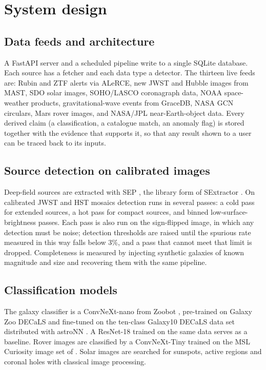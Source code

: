 \documentclass[preprint,11pt,authoryear]{elsarticle}
\begin{document}
\section{System design}
\label{sec:design}

\subsection{Data feeds and architecture}

A FastAPI server and a scheduled pipeline write to a single SQLite database. Each
source has a fetcher and each data type a detector. The thirteen live feeds are:
Rubin and ZTF alerts via ALeRCE, new JWST and Hubble images from MAST, SDO solar
images, SOHO/LASCO coronagraph data, NOAA space-weather products,
gravitational-wave events from GraceDB, NASA GCN circulars, Mars rover images,
and NASA/JPL near-Earth-object data. Every derived claim (a classification, a
catalogue match, an anomaly flag) is stored together with the evidence that
supports it, so that any result shown to a user can be traced back to its
inputs.

\subsection{Source detection on calibrated images}

Deep-field sources are extracted with SEP \citep{Barbary2016}, the library form
of SExtractor \citep{Bertin1996}. On calibrated JWST and HST mosaics detection
runs in several passes: a cold pass for extended sources, a hot pass for compact
sources, and binned low-surface-brightness passes. Each pass is also run on the
sign-flipped image, in which any detection must be noise; detection thresholds
are raised until the spurious rate measured in this way falls below 3\%, and a
pass that cannot meet that limit is dropped. Completeness is measured by
injecting synthetic galaxies of known magnitude and size and recovering them
with the same pipeline.

\subsection{Classification models}

The galaxy classifier is a ConvNeXt-nano \citep{Liu2022} from Zoobot
\citep{Walmsley2023}, pre-trained on Galaxy Zoo DECaLS \citep{Walmsley2022} and
fine-tuned on the ten-class Galaxy10 DECaLS data set distributed with astroNN
\citep{Leung2019}. A ResNet-18 \citep{He2016} trained on the same data serves as
a baseline. Rover images are classified by a ConvNeXt-Tiny trained on the MSL
Curiosity image set of \citet{Lu2020}. Solar images are searched for sunspots,
active regions and coronal holes with classical image processing.
\end{document}
